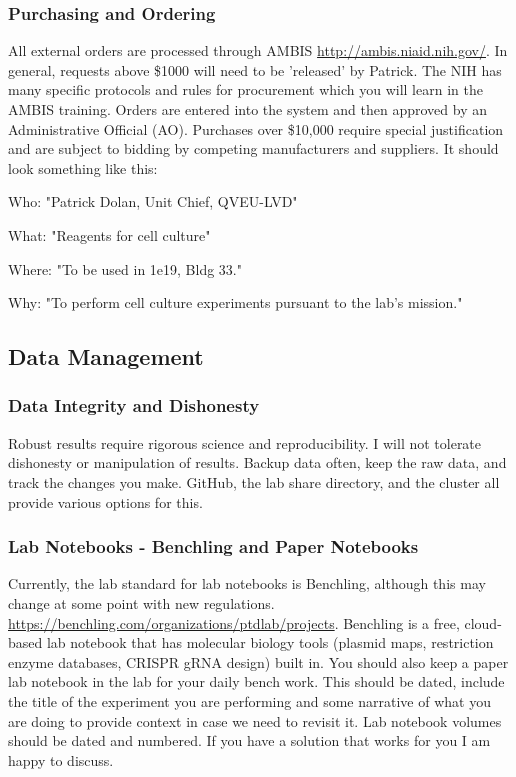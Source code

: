 \documentclass[10pt, letterpaper, twocolumn]{article} %
\begin{document}
\subsubsection{Purchasing and Ordering}
All external orders are processed through AMBIS \href{http://ambis.niaid.nih.gov/}{http://ambis.niaid.nih.gov/}. In general, requests above \$1000 will need to be 'released' by Patrick. The NIH has many specific protocols and rules for procurement which you will learn in the AMBIS training. Orders are entered into the system and then approved by an Administrative Official (AO). Purchases over \$10,000 require special justification and are subject to bidding by competing manufacturers and suppliers. 
It should look something like this: 
\begin{description}
\item Who: "Patrick Dolan, Unit Chief, QVEU-LVD"
\item What: "Reagents for cell culture"
\item Where: "To be used in 1e19, Bldg 33."
\item Why: "To perform cell culture experiments pursuant to the lab's mission."
\end{description}

\subsection{Data Management}
\subsubsection{Data Integrity and Dishonesty}
Robust results require rigorous science and reproducibility. I will not tolerate dishonesty or manipulation of results. Backup data often, keep the raw data, and track the changes you make. GitHub, the lab share directory, and the cluster all provide various options for this.

\subsubsection{Lab Notebooks - Benchling and Paper Notebooks}
Currently, the lab standard for lab notebooks is Benchling, although this may change at some point with new regulations. \href{https://benchling.com/organizations/ptdlab/projects}{https://benchling.com/organizations/ptdlab/projects}. Benchling is a free, cloud-based lab notebook that has molecular biology tools (plasmid maps, restriction enzyme databases, CRISPR gRNA design) built in. You should also keep a paper lab notebook in the lab for your daily bench work. This should be dated, include the title of the experiment you are performing and some narrative of what you are doing to provide context in case we need to revisit it. Lab notebook volumes should be dated and numbered. If you have a solution that works for you I am happy to discuss. 
\end{document}
